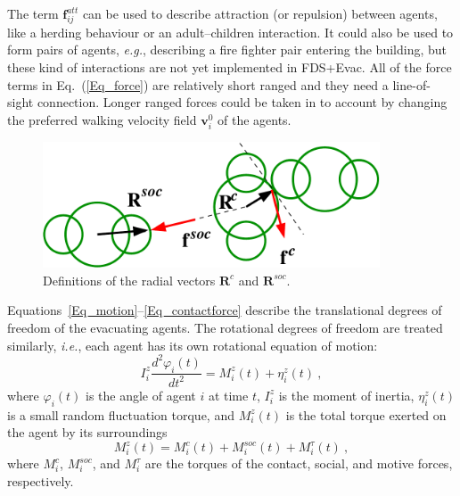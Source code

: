 \documentclass[12pt,a4paper,final,twoside]{stylevk}
\begin{document}
The term $\mathbf{f}_{ij}^{att}$ can be used to describe attraction
(or repulsion) between agents, like a herding behaviour or an
adult--children interaction.  It could also be used to form pairs of
agents, \emph{e.g.}, describing a fire fighter pair entering the
building, but these kind of interactions are not yet implemented in
FDS+Evac.  All of the force terms in Eq.~(\ref{Eq_force}) are
relatively short ranged and they need a line-of-sight connection.
Longer ranged forces could be taken in to account by changing the
preferred walking velocity field $ \mathbf{v}_i^0 $ of the agents.

%
\begin{figure}[!bt]
  \centerline{\includegraphics[clip=true, width=100mm]{FIGURES/body_shape_forces} }
\caption{Definitions of the radial vectors $\mathbf{R}^c$ and
  $\mathbf{R}^{soc}$. }\label{Fig_BodySize} 
\end{figure}
%

Equations~\ref{Eq_motion}--\ref{Eq_contactforce} describe the
translational degrees of freedom of the evacuating agents.  The
rotational degrees of freedom are treated similarly, \emph{i.e.}, each
agent has its own rotational equation of motion:
%
\begin{equation}\label{Eq_rotmotion}
   I^z_{i} \frac{d^2 \varphi_i (t)}{dt^2} = {M}^z_{i} (t)  +
  {\eta}^z_{i} (t) ~,  
\end{equation}
%
where $\varphi_i(t)$ is the angle of agent $i$ at time $t$,
$I^z_{i}$ is the moment of inertia, ${\eta}^z_{i} (t)$ is a small
random fluctuation torque, and ${M}^z_{i} (t)$ is the total torque
exerted on the agent by its surroundings
%
\begin{equation}\label{Eq_total_torque}
  {M}^z_{i} (t) =  {M}^c_{i} (t) + {M}^{soc}_{i} (t) +  {M}^{\tau}_{i}
  (t) ~,
\end{equation}
%
where ${M}^c_{i}$, ${M}^{soc}_{i}$, and ${M}^{\tau}_{i}$ are the
torques of the contact, social, and motive forces, respectively.
\end{document}
